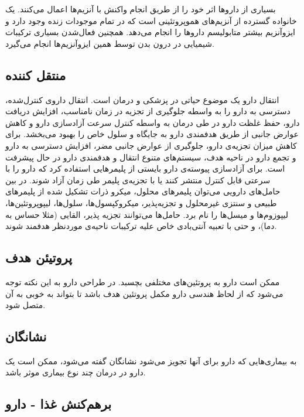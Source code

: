 بسیاری از داروها اثر خود را از طریق انجام واکنش با آنزیم‌ها
 اعمال می‌کنند. 
یک خانواده گسترده از آنزیم‌های هموپروتئینی است که در تمام موجودات زنده وجود دارد و ایزوآنزیم
بیشتر متابولیسم داروها را انجام می‌دهد. همچنین فعال‌شدن بسیاری ترکیبات شیمیایی در درون بدن توسط همین ایزوآنزیم‌ها انجام می‌گیرد.
  
\subsection{منتقل کننده‌}

انتقال دارو یک موضوع حیاتی در پزشکی و درمان است. انتقال داروی کنترل‌شده، دسترسی به دارو را به واسطه جلوگیری از تجزیه در زمان نامناسب، افزایش دریافت دارو، حفظ غلظت دارو در طی درمان به واسطه کنترل سرعت آزادسازی دارو و کاهش عوارض جانبی از طریق هدفمندی دارو به جایگاه و سلول خاص را بهبود می‌بخشد. برای کاهش میزان تجزیه‌ی دارو، جلوگیری از عوارض جانبی مضر، افزایش دسترسی به دارو و تجمع دارو در ناحیه هدف، سیستم‌های متنوع انتقال و هدفمندی دارو در حال پیشرفت است. برای آزادسازی پیوسته‌ی دارو بایستی از پلیمرهایی استفاده کرد که دارو را با سرعتی قابل کنترل منتشر کنند یا با تجزیه‌ی پلیمر طی زمان آزاد شوند. در بین حامل‌های دارویی می‌توان پلیمرهای محلول، میکرو ذرات تشکیل شده از پلیمرهای طبیعی و سنتزی غیرمحلول و تجزیه‌پذیر، میکروکپسول‌ها، سلول‌ها، لیپوپروتئین‌ها، لیپوزوم‌ها و میسل‌ها را نام برد. حامل‌ها می‌توانند تجزیه پذیر، القایی (مثلا حساس به دما)، و حتی با تعبیه آنتی‌بادی خاص علیه ترکیبات ناحیه‌ی موردنظر هدفمند شوند.

\subsection{پروتیئن هدف}

ممکن است دارو به پروتئین‌های مختلفی بچسبد. در طراحی دارو به این نکته توجه می‌شود که از لحاظ هندسی دارو مکمل پروتئین هدف باشد تا بتواند به خوبی به آن متصل شود.

\subsection{نشانگان}

به بیماری‌هایی که دارو برای آنها تجویز می‌شود نشانگان
 گفته‌ می‌شود، ممکن‌ است یک دارو در درمان چند نوع بیماری موثر باشد.

\subsection{برهم‌کنش غذا - دارو}


